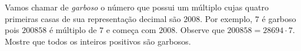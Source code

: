 Vamos chamar de \textit{garboso} o número que possui um múltiplo cujas quatro primeiras casas de sua representação decimal são $2008$.
Por exemplo, $7$ é garboso pois $200858$ é múltiplo de $7$ e começa com $2008$.
Observe que $200858 = 28694 \cdot 7$.
Mostre que todos os inteiros positivos são garbosos.